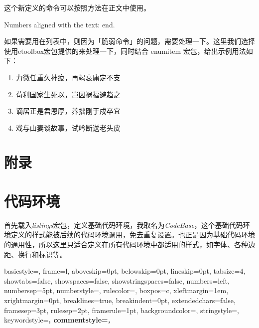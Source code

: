\begin{latex}
\usepackage{tikz}
\usepackage{etoolbox}
\newcommand{\circled}[2][]{\tikz[baseline=(char.base)]
    {\node[shape = circle, draw, inner sep = 1pt]
        (char) {\phantom{\ifblank{#1}{#2}{#1}}};%
        \node at (char.center) {\makebox[0pt][c]{#2}};}}
\robustify{\circled}
\end{latex}

这个新定义的命令可以按照方法在正文中使用。

\begin{codeshow}
Numbers aligned with the text:     end.
\end{codeshow}

如果需要用在列表中，则因为「脆弱命令」的问题，需要处理一下。这里我们选择使用etoolbox宏包提供的来处理一下，同时结合 enumitem 宏包，给出示例用法如下：

\begin{codeshow}
\begin{enumerate}[label=\dcircled{\arabic*}, noitemsep]
    \item 力微任重久神疲，再竭衰庸定不支
    \item 苟利国家生死以，岂因祸福避趋之
    \item 谪居正是君恩厚，养拙刚于戍卒宜
    \item 戏与山妻谈故事，试吟断送老头皮
\end{enumerate}
\end{codeshow}


\section{附录}

\section{代码环境}

首先载入\emph{listings}宏包，定义基础代码环境，我取名为\emph{CodeBase}，这个基础代码环境定义的样式能被后续的代码环境调用，免去重复设置。也正是因为基础代码环境的通用性，所以这里只适合定义在所有代码环境中都适用的样式，如字体、各种边距、换行和标识等。

\begin{latex}
{
    basicstyle=\small\ttfamily,
    frame=l,
    aboveskip=0pt,%
    belowskip=0pt,%
    lineskip=0pt,
    tabsize=4,%
    showtabs=false,%
    showspaces=false,%
    showstringspaces=false,
    numbers=left,
    numbersep=5pt,%
    numberstyle=\small\ttfamily,
    rulecolor=\color{cyan},
    boxpos=c,
    xleftmargin=1em,%
    xrightmargin=0pt,
    breaklines=true,%
    breakindent=0pt,%
    extendedchars=false,%
    framesep=3pt,
    rulesep=2pt,
    framerule=1pt,
    backgroundcolor=\color{gray!5},
    stringstyle=\color{green!40!black!100},
    keywordstyle=\bfseries\color[RGB]{0,0,255},
    commentstyle=\slshape\color{black!60},
}
\end{latex}

